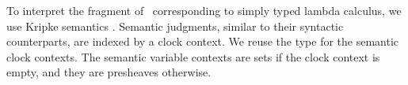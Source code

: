 
To interpret the fragment of \GTT\ corresponding to simply typed lambda calculus, we use Kripke semantics \cite{maclane1992sheaves}.
Semantic judgments, similar to their syntactic counterparts, are indexed by
a clock context. We reuse the type  for the semantic
clock contexts.
The semantic variable contexts are sets if the clock context is empty, and
they are presheaves otherwise.
\begin{code}%
\>[0]\AgdaSpace{}%
\AgdaSymbol{:}\AgdaSpace{}%
\AgdaSpace{}%
\AgdaSpace{}%
\<%
\\
\>[0]\AgdaSpace{}%
\AgdaSpace{}%
\AgdaSymbol{=}\AgdaSpace{}%
\<%
\\
\>[0]\AgdaSpace{}%
\AgdaSpace{}%
\AgdaSymbol{=}\AgdaSpace{}%
\<%
\end{code}
